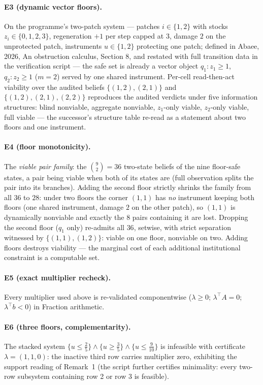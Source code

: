 \documentclass[10pt,twocolumn]{article}
\theoremstyle{definition}
\begin{document}
\paragraph{E3 (dynamic vector floors).}
On the programme's two-patch system --- patches $i\in\{1,2\}$ with stocks
$z_i\in\{0,1,2,3\}$, regeneration $+1$ per step capped at $3$, damage $2$
on the unprotected patch, instruments $u\in\{1,2\}$ protecting one patch;
defined in Abaee, 2026, An obstruction calculus, Section 8, and restated with full transition data
in the verification script --- the safe set is already a vector object
$q_1: z_1\ge 1$, $q_2: z_2\ge 1$ ($m=2$) served by one shared instrument.
Per-cell read-then-act viability over the audited beliefs
$\{(1,2),(2,1)\}$ and $\{(1,2),(2,1),(2,2)\}$ reproduces the audited
verdicts under five information structures: blind nonviable, aggregate
nonviable, $z_1$-only viable, $z_2$-only viable, full viable --- the
successor's structure table re-read as a statement about two floors and one
instrument.

\paragraph{E4 (floor monotonicity).}
The \emph{viable pair family}: the $\binom{9}{2}=36$ two-state beliefs of
the nine floor-safe states, a pair being viable when both of its states are
(full observation splits the pair into its branches). Adding the second
floor strictly shrinks the family from all $36$ to $28$: under two floors
the corner $(1,1)$ has \emph{no} instrument keeping both floors (one
shared instrument, damage $2$ on the other patch), so $(1,1)$ is
dynamically nonviable and exactly the $8$ pairs containing it are lost.
Dropping the second floor ($q_1$ only) re-admits all $36$, setwise, with
strict separation witnessed by $\{(1,1),(1,2)\}$: viable on one floor,
nonviable on two. Adding floors destroys viability --- the marginal cost of
each additional institutional constraint is a computable set.

\paragraph{E5 (exact multiplier recheck).}
Every multiplier used above is re-validated componentwise
($\lambda\ge0$; $\lambda^{\top}A=0$; $\lambda^{\top}b<0$) in Fraction
arithmetic.

\paragraph{E6 (three floors, complementarity).}
The stacked system $\{u\le\tfrac25\}\wedge\{u\ge\tfrac35\}\wedge
\{u\le\tfrac9{10}\}$ is infeasible with certificate $\lambda=(1,1,0)$: the
inactive third row carries multiplier zero, exhibiting the support reading
of Remark~1 (the script further certifies minimality: every two-row
subsystem containing row 2 or row 3 is feasible).
\end{document}
